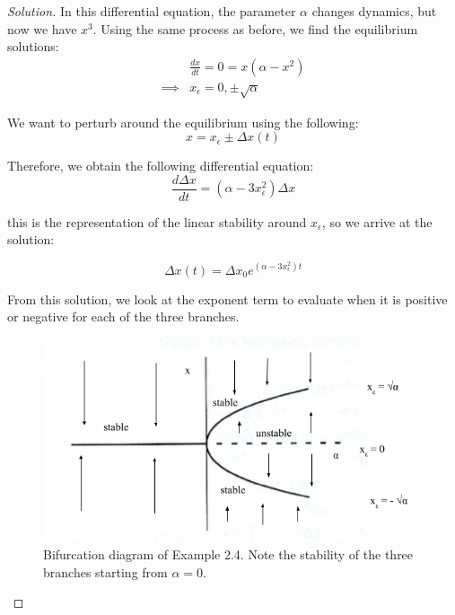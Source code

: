 \documentclass{article}
\theoremstyle{definition}
\theoremstyle{remark}
\begin{document}
\begin{proof}[Solution]\renewcommand{\qedsymbol}{}
In this differential equation, the parameter $\alpha$ changes dynamics, but now we have $x^3$. Using the same process as before, we find the equilibrium solutions:
\begin{align*}\label{equilibria 2.4}
    &\frac{dx}{dt} = 0 = 
    x(\alpha - x^2) \nonumber 
    \\
    \implies &x_\epsilon = \boxed{0,\pm \sqrt{\alpha}}
\end{align*}

We want to perturb around the equilibrium using the following:
\begin{equation}
    x = \boxed{x_\epsilon \pm \Delta x(t)} 
\end{equation}

Therefore, we obtain the following differential equation: 
\begin{equation}
    \frac{d\Delta x}{dt} = (\alpha - 3 x_\epsilon ^2) \Delta x
\end{equation}

this is the representation of the linear stability around $x_\epsilon$, so we arrive at the solution:

\begin{equation}
    \Delta x(t) = \boxed{\Delta x_0  e^{(\alpha - 3 x_\epsilon^2)t}}
\end{equation}

From this solution, we look at the exponent term to evaluate when it is positive or negative for each of the three branches. 

\begin{figure}[H]
    \centering
    \includegraphics[width=115mm,scale=1.0]{images/Pitchfork.png}
    \caption{Bifurcation diagram of Example 2.4. Note the stability of the three branches starting from $\alpha = 0$.}
    \label{fig:pitchfork}
\end{figure}
\end{proof}
\end{document}
